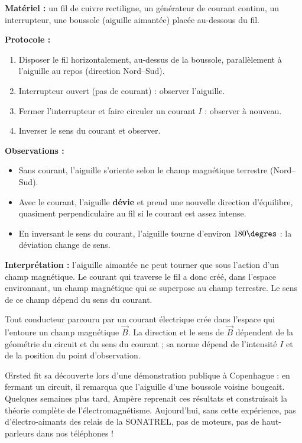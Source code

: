 \documentclass[11pt]{article}
\newcommand{\cle}[1]{{\popxbold\color{popdark}#1}}
\begin{document}
\begin{experience}
\textbf{Matériel :} un fil de cuivre rectiligne, un générateur de courant continu, un interrupteur, une boussole (aiguille aimantée) placée au-dessous du fil.

\textbf{Protocole :}
\begin{enumerate}
\item Disposer le fil horizontalement, au-dessus de la boussole, parallèlement à l'aiguille au repos (direction Nord--Sud).
\item Interrupteur ouvert (pas de courant) : observer l'aiguille.
\item Fermer l'interrupteur et faire circuler un courant $I$ : observer à nouveau.
\item Inverser le sens du courant et observer.
\end{enumerate}

\textbf{Observations :}
\begin{itemize}
\item Sans courant, l'aiguille s'oriente selon le champ magnétique terrestre (Nord--Sud).
\item Avec le courant, l'aiguille \textbf{dévie} et prend une nouvelle direction d'équilibre, quasiment perpendiculaire au fil si le courant est assez intense.
\item En inversant le sens du courant, l'aiguille tourne d'environ $180\degres$ : la déviation change de sens.
\end{itemize}

\textbf{Interprétation :} l'aiguille aimantée ne peut tourner que sous l'action d'un champ magnétique. Le courant qui traverse le fil a donc créé, dans l'espace environnant, un champ magnétique qui se superpose au champ terrestre. Le sens de ce champ dépend du sens du courant.
\end{experience}

\begin{aretenir}
Tout conducteur parcouru par un courant électrique crée dans l'espace qui l'entoure un \cle{champ magnétique} $\vec{B}$. La direction et le sens de $\vec{B}$ dépendent de la géométrie du circuit et du sens du courant ; sa norme dépend de l'intensité $I$ et de la position du point d'observation.
\end{aretenir}

\begin{savaistu}
Œrsted fit sa découverte lors d'une démonstration publique à Copenhague : en fermant un circuit, il remarqua que l'aiguille d'une boussole voisine bougeait. Quelques semaines plus tard, Ampère reprenait ces résultats et construisait la théorie complète de l'électromagnétisme. Aujourd'hui, sans cette expérience, pas d'électro-aimants des relais de la SONATREL, pas de moteurs, pas de haut-parleurs dans nos téléphones !
\end{savaistu}
\end{document}
